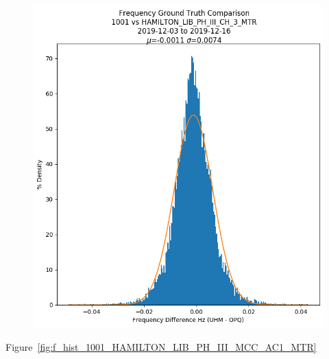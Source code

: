 \begin{figure}[H]
    \centering
    \includegraphics[width=\linewidth]{figures/f_hist_1001_HAMILTON_LIB_PH_III_CH_3_MTR.png}
    \caption{}
    \label{fig:f_hist_1001_HAMILTON_LIB_PH_III_CH_3_MTR}
\end{figure}

Figure~\ref{fig:f_hist_1001_HAMILTON_LIB_PH_III_MCC_AC1_MTR}


